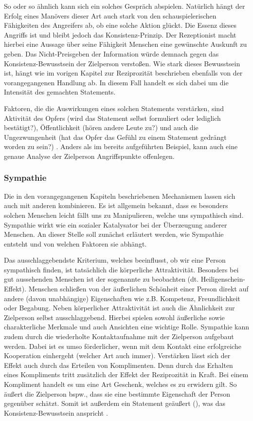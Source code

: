So oder so ähnlich kann sich ein solches Gespräch abspielen. Natürlich hängt der Erfolg eines Manövers dieser Art auch stark von den schauspielerischen Fähigkeiten des Angreifers ab, ob eine solche Aktion glückt.
Die Essenz dieses Angriffs ist und bleibt jedoch das Konsistenz-Prinzip. Der Rezeptionist macht hierbei eine Aussage über seine Fähigkeit Menschen eine gewünschte Auskunft zu geben. Das Nicht-Preisgeben der Information würde demnach gegen das Konsistenz-Bewusstsein der Zielperson verstoßen. Wie stark dieses Bewusstsein ist, hängt wie im vorigen Kapitel zur Reziprozität beschrieben ebenfalls von der vorangegangenen Handlung ab. In diesem Fall handelt es sich dabei um die Intensität des gemachten Statements.

Faktoren, die die Auswirkungen eines solchen Statements verstärken, sind Aktivität des Opfers (wird das Statement selbst formuliert oder lediglich bestätigt?), Öffentlichkeit (hören andere Leute zu?) und auch die Ungezwungenheit (hat das Opfer das Gefühl zu einem Statement gedrängt worden zu sein?) \citep{cialdini}.
Anders als im bereits aufgeführten Beispiel, kann auch eine genaue Analyse der Zielperson Angriffspunkte offenlegen.

\subsubsection{Sympathie}\label{sec:sympathie}
Die in den vorangegangenen Kapiteln beschriebenen Mechanismen lassen sich auch mit anderen  kombinieren. Es ist allgemein bekannt, dass es besonders solchen Menschen leicht fällt uns zu Manipulieren, welche uns sympathisch sind.
Sympathie wirkt wie ein sozialer Katalysator bei der Überzeugung anderer Menschen. 
An dieser Stelle soll zunächst erläutert werden, wie Sympathie entsteht und von welchen Faktoren sie abhängt.

Das ausschlaggebendste Kriterium, welches beeinflusst, ob wir eine Person sympathisch finden, ist tatsächlich die körperliche Attraktivität. Besonders bei gut aussehenden Menschen ist der sogenannte  zu beobachten (dt. Heiligenschein-Effekt). Menschen schließen von der äußerlichen Schönheit einer Person direkt auf andere (davon unabhängige) Eigenschaften wie z.B. Kompetenz, Freundlichkeit
oder Begabung.
Neben körperlicher Attraktivität ist auch die Ähnlichkeit zur Zielperson selbst ausschlaggebend. Hierbei spielen sowohl äußerliche sowie charakterliche Merkmale und auch Ansichten eine wichtige Rolle.
Sympathie kann zudem durch die wiederholte Kontaktaufnahme mit der Zielperson aufgebaut werden. Dabei ist es umso förderlicher, wenn mit dem Kontakt eine erfolgreiche Kooperation einhergeht (welcher Art auch immer). Verstärken lässt sich der Effekt auch durch das Erteilen von Komplimenten. Denn durch das Erhalten eines Kompliments tritt zusätzlich der Effekt der Reziprozität in Kraft. Bei einem Kompliment handelt es um eine Art Geschenk, welches es zu erwidern gilt. So äußert die Zielperson bspw., dass sie eine bestimmte Eigenschaft der Person gegenüber schätzt. Somit ist außerdem ein Statement geäußert (), was das Konsistenz-Bewusstsein anspricht \citep{cialdini}.

